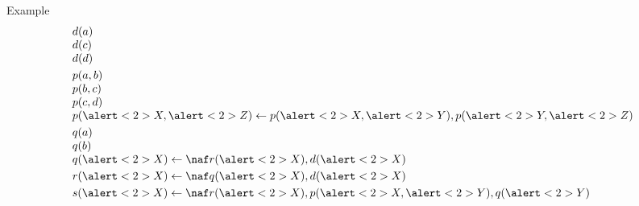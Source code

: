 \begin{frame}[c]{Example}
  \[
    \begin{array}{l}
      d(a) \\
      d(c) \\
      d(d) \\[3pt]
      p(a,b) \\
      p(b,c) \\
      p(c,d) \\
      p(\alert<2>{X},\alert<2>{Z}) \leftarrow p(\alert<2>{X},\alert<2>{Y}), p(\alert<2>{Y},\alert<2>{Z}) \\[3pt]
      q(a) \\
      q(b) \\
      q(\alert<2>{X}) \leftarrow \naf r(\alert<2>{X}), d(\alert<2>{X}) \\[3pt]
      r(\alert<2>{X}) \leftarrow \naf q(\alert<2>{X}), d(\alert<2>{X}) \\[3pt]
      s(\alert<2>{X}) \leftarrow \naf r(\alert<2>{X}), p(\alert<2>{X},\alert<2>{Y}), q(\alert<2>{Y})
    \end{array}
  \]
  \bigskip
\end{frame}
%
